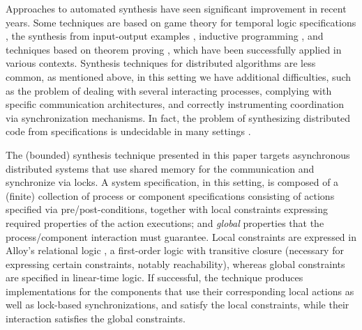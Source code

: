 
Approaches to automated synthesis have seen significant improvement in recent years. Some techniques are based on game theory for temporal logic specifications \cite{Piterman+2006}, the synthesis from input-output examples \cite{Jha+2010}, inductive programming \cite{Abate+2018}, and techniques based on theorem proving \cite{Srivastava+2010}, which have been successfully applied in various contexts. Synthesis techniques for distributed algorithms are less common, as mentioned above,  in this setting we have  additional difficulties, such as the problem of dealing with several interacting processes, complying with specific communication architectures, and correctly instrumenting coordination via synchronization mechanisms. In fact, the problem of synthesizing distributed code from specifications is undecidable in many settings \cite{PnueliRosner90}.

The  (bounded) synthesis technique presented in this paper targets  asynchronous distributed systems that use shared memory for the communication and synchronize via locks.  A system specification, in this setting, is composed of a (finite) collection of process or component specifications consisting of actions specified via pre/post-conditions,  together with local constraints expressing required properties of the action  executions; and \emph{global} properties that the process/component interaction must guarantee.  Local constraints are expressed in Alloy's relational logic \cite{AlloyBook}, a first-order logic with transitive closure (necessary for expressing certain constraints, notably reachability), whereas global constraints are specified in linear-time logic.  If successful,  the technique produces implementations for the components that use their corresponding local actions as well as lock-based synchronizations, and satisfy the local constraints, while their interaction satisfies the global constraints.  

